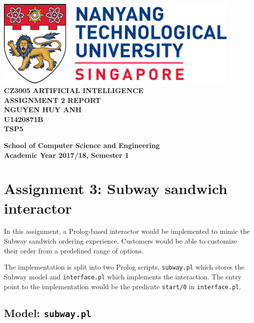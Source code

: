 \documentclass[11pt]{report}
\begin{document}
\begin{titlepage}
    \begin{center}
    
    \includegraphics[width=0.9\textwidth]{ntu_logo}
    \\[6cm]
    
    \uppercase{
    \textbf{CZ3005 Artificial Intelligence}\\
    \textbf{Assignment 2 Report}
    \\[2cm]
    \textbf{Nguyen Huy Anh}\\
    \textbf{U1420871B}\\
    \textbf{TSP5}
    }
    
    \vfill
    
    \textbf{School of Computer Science and Engineering}
    \\
    \textbf{Academic Year 2017/18, Semester 1}
    
    \end{center}
\end{titlepage}

\section*{Assignment 3: Subway sandwich interactor}

In this assignment, a Prolog-based interactor would be implemented to mimic
the Subway sandwich ordering experience. Customers would be able to customize
their order from a predefined range of options.

The implementation is split into two Prolog scripts, \texttt{subway.pl} which
stores the Subway model and \texttt{interface.pl} which implements the
interaction. The entry point to the implementation would be the predicate
\texttt{start/0} in \texttt{interface.pl}.

\subsection*{Model: \texttt{subway.pl}}
\end{document}
